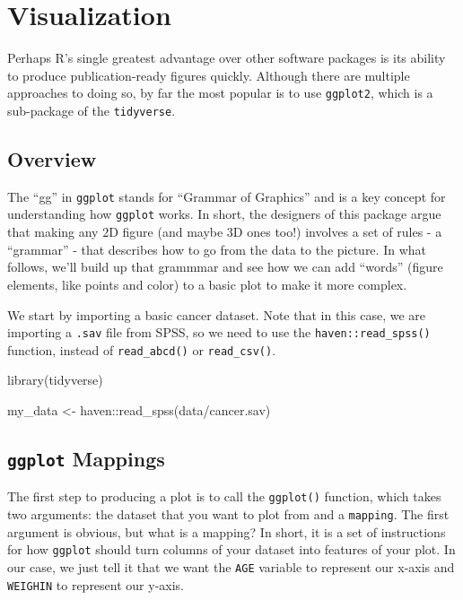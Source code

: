 \documentclass[
]{book}
\newenvironment{Shaded}{\begin{snugshade}}{\end{snugshade}}
\newcommand{\FunctionTok}[1]{\textcolor[rgb]{0.00,0.00,0.00}{#1}}
\newcommand{\NormalTok}[1]{#1}
\newcommand{\OtherTok}[1]{\textcolor[rgb]{0.56,0.35,0.01}{#1}}
\newcommand{\SpecialCharTok}[1]{\textcolor[rgb]{0.00,0.00,0.00}{#1}}
\newcommand{\StringTok}[1]{\textcolor[rgb]{0.31,0.60,0.02}{#1}}
\begin{document}
\hypertarget{visualization}{%
\chapter{Visualization}\label{visualization}}

Perhaps R's single greatest advantage over other software packages is its ability to produce publication-ready figures quickly. Although there are multiple approaches to doing so, by far the most popular is to use \texttt{ggplot2}, which is a sub-package of the \texttt{tidyverse}.

\hypertarget{overview}{%
\section{Overview}\label{overview}}

The ``gg'' in \texttt{ggplot} stands for ``Grammar of Graphics'' and is a key concept for understanding how \texttt{ggplot} works. In short, the designers of this package argue that making any 2D figure (and maybe 3D ones too!) involves a set of rules - a ``grammar'' - that describes how to go from the data to the picture. In what follows, we'll build up that grammmar and see how we can add ``words'' (figure elements, like points and color) to a basic plot to make it more complex.

We start by importing a basic cancer dataset. Note that in this case, we are importing a \texttt{.sav} file from SPSS, so we need to use the \texttt{haven::read\_spss()} function, instead of \texttt{read\_abcd()} or \texttt{read\_csv()}.

\begin{Shaded}
\begin{Highlighting}[]
\FunctionTok{library}\NormalTok{(tidyverse)}

\NormalTok{my\_data }\OtherTok{\textless{}{-}}\NormalTok{ haven}\SpecialCharTok{::}\FunctionTok{read\_spss}\NormalTok{(}\StringTok{\textquotesingle{}data/cancer.sav\textquotesingle{}}\NormalTok{)}
\end{Highlighting}
\end{Shaded}

\hypertarget{ggplot-mappings}{%
\section{\texorpdfstring{\texttt{ggplot} Mappings}{ggplot Mappings}}\label{ggplot-mappings}}

The first step to producing a plot is to call the \texttt{ggplot()} function, which takes two arguments: the dataset that you want to plot from and a \texttt{mapping}. The first argument is obvious, but what is a mapping? In short, it is a set of instructions for how \texttt{ggplot} should turn columns of your dataset into features of your plot. In our case, we just tell it that we want the \texttt{AGE} variable to represent our x-axis and \texttt{WEIGHIN} to represent our y-axis.
\end{document}
